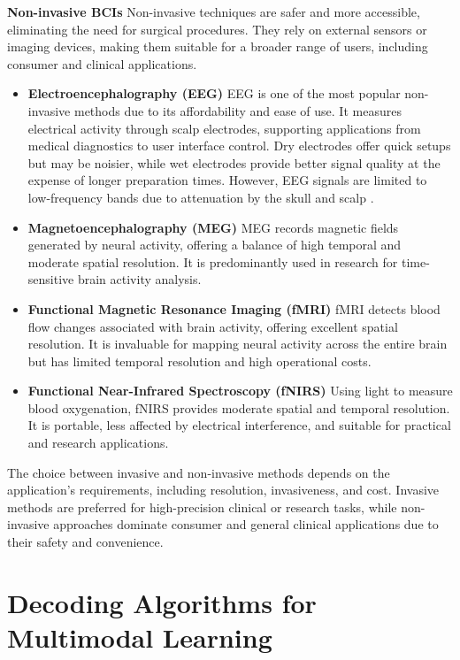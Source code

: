 \documentclass[journal]{IEEEtran}
\begin{document}
\textbf{Non-invasive BCIs} Non-invasive techniques \cite{Edelman2024} are safer and more accessible, eliminating the need for surgical procedures. They rely on external sensors or imaging devices, making them suitable for a broader range of users, including consumer and clinical applications.
\begin{itemize}
\item \textbf{Electroencephalography (EEG)} EEG \cite{Roy2019, Gu2021} is one of the most popular non-invasive methods due to its affordability and ease of use. It measures electrical activity through scalp electrodes, supporting applications from medical diagnostics to user interface control. Dry electrodes offer quick setups but may be noisier, while wet electrodes provide better signal quality at the expense of longer preparation times. However, EEG signals are limited to low-frequency bands due to attenuation by the skull and scalp \cite{NicolasAlonso2012}.
\item \textbf{Magnetoencephalography (MEG)} MEG \cite{Cohen1972} records magnetic fields generated by neural activity, offering a balance of high temporal and moderate spatial resolution. It is predominantly used in research for time-sensitive brain activity analysis.
\item \textbf{Functional Magnetic Resonance Imaging (fMRI)} fMRI \cite{Sitaram2008, Du2022} detects blood flow changes associated with brain activity, offering excellent spatial resolution. It is invaluable for mapping neural activity across the entire brain but has limited temporal resolution and high operational costs.
\item \textbf{Functional Near-Infrared Spectroscopy (fNIRS)} Using light to measure blood oxygenation, fNIRS \cite{Joebsis1977} provides moderate spatial and temporal resolution. It is portable, less affected by electrical interference, and suitable for practical and research applications.
\end{itemize}

The choice between invasive and non-invasive methods depends on the application's requirements, including resolution, invasiveness, and cost. Invasive methods are preferred for high-precision clinical or research tasks, while non-invasive approaches dominate consumer and general clinical applications due to their safety and convenience.

\section{Decoding Algorithms for Multimodal Learning} \label{sect:methods}
\end{document}
